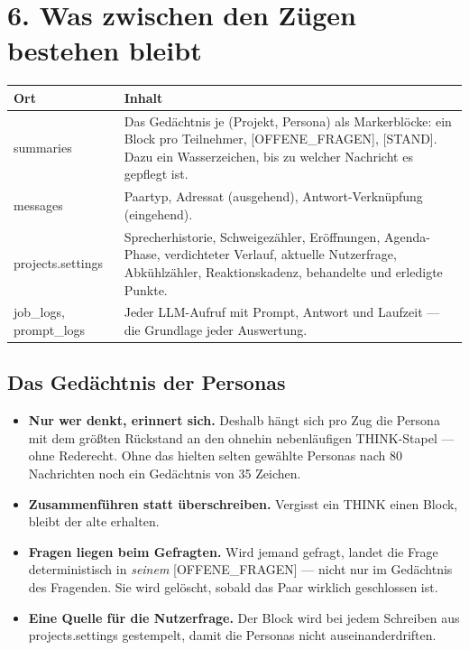 \documentclass[11pt,a4paper]{article}
\newcommand{\code}[1]{{\ttfamily\small #1}}
\begin{document}
\section*{6. Was zwischen den Zügen bestehen bleibt}

\begin{center}\sffamily\footnotesize
\begin{tabular}{@{}p{34mm}p{116mm}@{}}
\toprule
\textbf{Ort} & \textbf{Inhalt} \\
\midrule
\code{summaries} &
  Das Gedächtnis je (Projekt, Persona) als Markerblöcke: ein Block pro Teilnehmer,
  \code{[OFFENE\_FRAGEN]}, \code{[STAND]}. Dazu ein Wasserzeichen, bis zu welcher
  Nachricht es gepflegt ist. \\
\code{messages} &
  Paartyp, Adressat (ausgehend), Antwort-Verknüpfung (eingehend). \\
\code{projects.settings} &
  Sprecherhistorie, Schweigezähler, Eröffnungen, Agenda-Phase, verdichteter Verlauf,
  aktuelle Nutzerfrage, Abkühlzähler, Reaktionskadenz, behandelte und erledigte Punkte. \\
\code{job\_logs}, \code{prompt\_logs} &
  Jeder LLM-Aufruf mit Prompt, Antwort und Laufzeit --- die Grundlage jeder Auswertung. \\
\bottomrule
\end{tabular}
\end{center}

\subsection*{Das Gedächtnis der Personas}

\begin{itemize}
  \item \textbf{Nur wer denkt, erinnert sich.} Deshalb hängt sich pro Zug die Persona mit
        dem größten Rückstand an den ohnehin nebenläufigen THINK-Stapel --- ohne
        Rederecht. Ohne das hielten selten gewählte Personas nach 80 Nachrichten noch ein
        Gedächtnis von 35 Zeichen.
  \item \textbf{Zusammenführen statt überschreiben.} Vergisst ein THINK einen Block,
        bleibt der alte erhalten.
  \item \textbf{Fragen liegen beim Gefragten.} Wird jemand gefragt, landet die Frage
        deterministisch in \emph{seinem} \code{[OFFENE\_FRAGEN]} --- nicht nur im Gedächtnis
        des Fragenden. Sie wird gelöscht, sobald das Paar wirklich geschlossen ist.
  \item \textbf{Eine Quelle für die Nutzerfrage.} Der Block wird bei jedem Schreiben aus
        \code{projects.settings} gestempelt, damit die Personas nicht auseinanderdriften.
\end{itemize}
\end{document}
